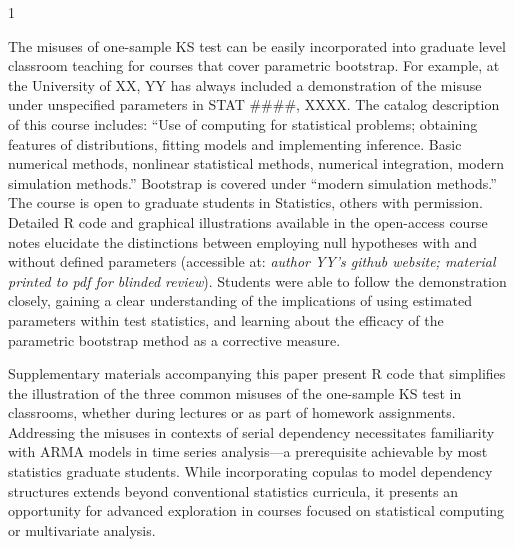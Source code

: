 \documentclass[12pt, letterpaper]{article}
\newcommand{\blind}{1}
\begin{document}
\blind
{
The misuses of one-sample KS test can be easily incorporated into graduate level
classroom teaching for courses that cover parametric bootstrap. For example, at
the University of XX, YY has always included a demonstration of the misuse under 
unspecified parameters in STAT $\#\#\#\#$, XXXX. The
catalog description of this course includes: ``Use of computing for statistical
problems; obtaining features of distributions, fitting models and implementing
inference. Basic numerical methods, nonlinear statistical methods, numerical
integration, modern simulation methods.'' Bootstrap is covered under ``modern
simulation methods.''  The course is open to graduate students in Statistics,
others with permission. Detailed R code and graphical illustrations available in
the open-access course notes elucidate the distinctions between employing null
hypotheses with and without defined parameters (accessible at: 
\textit{author YY's github website; material printed to pdf for blinded review}).
Students were able to follow the demonstration closely, gaining a clear
understanding of the implications of using estimated parameters within test
statistics, and learning about the efficacy of the parametric bootstrap method
as a corrective measure.


Supplementary materials accompanying this paper present R code that simplifies
the illustration of the three common misuses of the one-sample KS test in
classrooms, whether during lectures or as part of homework assignments.
Addressing the misuses in contexts of serial dependency necessitates familiarity
with ARMA models in time series analysis---a prerequisite achievable by most
statistics graduate students. While incorporating copulas to model dependency
structures extends beyond conventional statistics curricula, it presents an
opportunity for advanced exploration in courses focused on statistical computing
or multivariate analysis. 


}
\end{document}
